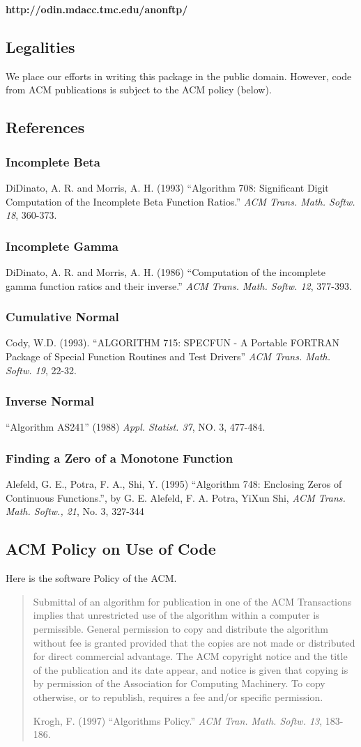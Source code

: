 \documentclass[12pt,dvips]{article}
\newcommand{\mysubsection}[1] {\color{green}
             \subsection{#1} \normalcolor}
\newcommand{\mysubsubsection}[1]{\color{Orange}
             \subsubsection{#1} \normalcolor}
\begin{document}
{\bf http://odin.mdacc.tmc.edu/anonftp/\\}

\mysubsection{Legalities}

We place  our efforts  in writing this  package in the  public domain.
However,  code from  ACM publications  is  subject to  the ACM  policy
(below).

\mysubsection{References}

\mysubsubsection{Incomplete Beta}

DiDinato, A. R. and Morris,  A.   H. (1993)  ``Algorithm 708: Significant
Digit Computation of the Incomplete  Beta  Function Ratios.''  {\em ACM
Trans. Math.  Softw. 18}, 360-373.

\mysubsubsection{Incomplete Gamma}

DiDinato, A. R. and Morris, A. H. (1986) ``Computation of the  incomplete
gamma function  ratios  and their  inverse.''   {\em ACM  Trans.  Math.
Softw. 12}, 377-393.

\mysubsubsection{Cumulative Normal}

Cody, W.D. (1993). ``ALGORITHM 715: SPECFUN - A Portable FORTRAN
Package of Special Function Routines and Test Drivers''
{\em ACM Trans. Math. Softw. 19}, 22-32.

\mysubsubsection{Inverse Normal}

``Algorithm AS241'' (1988) {\em Appl. Statist. 37}, NO. 3, 477-484.

\mysubsubsection{Finding a Zero of a Monotone Function}

Alefeld,  G.  E.,  Potra,  F.  A., Shi,  Y.  (1995)  ``Algorithm  748:
Enclosing  Zeros  of  Continuous   Functions.'',  by  G.  E.  Alefeld,
F.  A. Potra, YiXun  Shi, {\em ACM  Trans.  Math. Softw.,
21}, No. 3, 327-344

\mysubsection{ACM Policy on Use of Code}

Here  is the  software Policy of  the  ACM.

\begin{quote}

     Submittal of  an  algorithm    for publication  in   one of   the  ACM
     Transactions implies that unrestricted use  of the algorithm within  a
     computer is permissible.   General permission  to copy and  distribute
     the algorithm without fee is granted provided that the copies  are not
     made  or   distributed for  direct   commercial  advantage.    The ACM
     copyright notice and the title of the publication and its date appear,
     and  notice is given that copying  is by permission of the Association
     for Computing Machinery.  To copy otherwise, or to republish, requires
     a fee and/or specific permission.

     Krogh, F.  (1997) ``Algorithms  Policy.''  {\em ACM  Tran.  Math.
     Softw.  13}, 183-186.

\end{quote}
\end{document}
